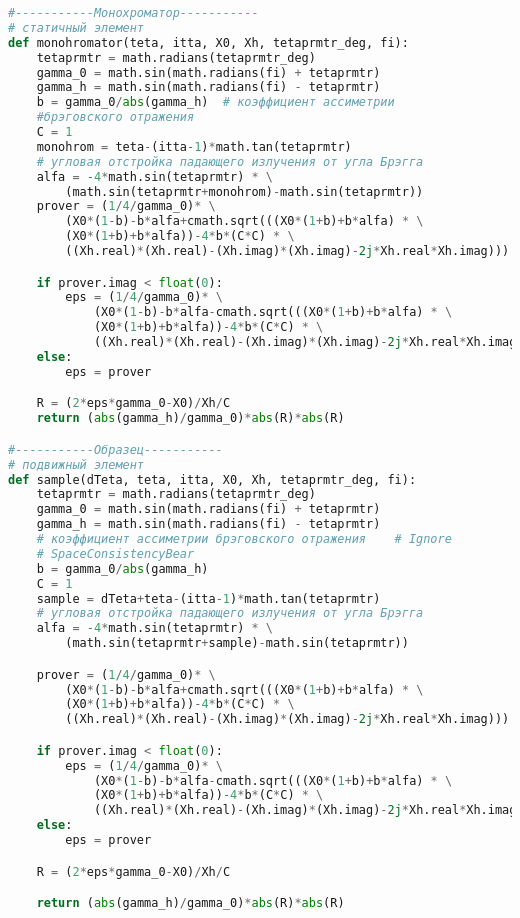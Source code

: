 
\newpage
  \begin{center}
  \section{ }%
  \label{sec:sample_functions}
  \end{center}
{\scriptsize
\begin{lstlisting}[language=Python]

#-----------Монохроматор-----------
# статичный элемент
def monohromator(teta, itta, X0, Xh, tetaprmtr_deg, fi):
    tetaprmtr = math.radians(tetaprmtr_deg)
    gamma_0 = math.sin(math.radians(fi) + tetaprmtr)
    gamma_h = math.sin(math.radians(fi) - tetaprmtr)
    b = gamma_0/abs(gamma_h)  # коэффициент ассиметрии
    #брэговского отражения
    C = 1
    monohrom = teta-(itta-1)*math.tan(tetaprmtr)
    # угловая отстройка падающего излучения от угла Брэгга
    alfa = -4*math.sin(tetaprmtr) * \
        (math.sin(tetaprmtr+monohrom)-math.sin(tetaprmtr))
    prover = (1/4/gamma_0)* \
        (X0*(1-b)-b*alfa+cmath.sqrt(((X0*(1+b)+b*alfa) * \
        (X0*(1+b)+b*alfa))-4*b*(C*C) * \
        ((Xh.real)*(Xh.real)-(Xh.imag)*(Xh.imag)-2j*Xh.real*Xh.imag)))

    if prover.imag < float(0):
        eps = (1/4/gamma_0)* \
            (X0*(1-b)-b*alfa-cmath.sqrt(((X0*(1+b)+b*alfa) * \
            (X0*(1+b)+b*alfa))-4*b*(C*C) * \
            ((Xh.real)*(Xh.real)-(Xh.imag)*(Xh.imag)-2j*Xh.real*Xh.imag)))
    else:
        eps = prover

    R = (2*eps*gamma_0-X0)/Xh/C
    return (abs(gamma_h)/gamma_0)*abs(R)*abs(R)

#-----------Образец-----------
# подвижный элемент
def sample(dTeta, teta, itta, X0, Xh, tetaprmtr_deg, fi):
    tetaprmtr = math.radians(tetaprmtr_deg)
    gamma_0 = math.sin(math.radians(fi) + tetaprmtr)
    gamma_h = math.sin(math.radians(fi) - tetaprmtr)
    # коэффициент ассиметрии брэговского отражения    # Ignore
    # SpaceConsistencyBear
    b = gamma_0/abs(gamma_h)
    C = 1
    sample = dTeta+teta-(itta-1)*math.tan(tetaprmtr)
    # угловая отстройка падающего излучения от угла Брэгга
    alfa = -4*math.sin(tetaprmtr) * \
        (math.sin(tetaprmtr+sample)-math.sin(tetaprmtr))

    prover = (1/4/gamma_0)* \
        (X0*(1-b)-b*alfa+cmath.sqrt(((X0*(1+b)+b*alfa) * \
        (X0*(1+b)+b*alfa))-4*b*(C*C) * \
        ((Xh.real)*(Xh.real)-(Xh.imag)*(Xh.imag)-2j*Xh.real*Xh.imag)))

    if prover.imag < float(0):
        eps = (1/4/gamma_0)* \
            (X0*(1-b)-b*alfa-cmath.sqrt(((X0*(1+b)+b*alfa) * \
            (X0*(1+b)+b*alfa))-4*b*(C*C) * \
            ((Xh.real)*(Xh.real)-(Xh.imag)*(Xh.imag)-2j*Xh.real*Xh.imag)))
    else:
        eps = prover

    R = (2*eps*gamma_0-X0)/Xh/C

    return (abs(gamma_h)/gamma_0)*abs(R)*abs(R)


\end{lstlisting}
}
